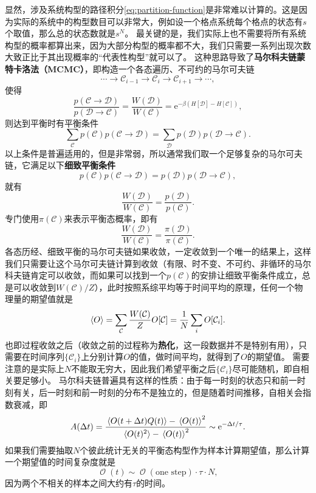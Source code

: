 \documentclass[hyperref, UTF8, a4paper]{ctexart}
\newcommand*{\ee}{\mathrm{e}}
\DeclareMathOperator{\bigO}{\mathcal{O}}
\newcommand*{\concept}[1]{{\textbf{#1}}}
\begin{document}
显然，涉及系统构型的路径积分\eqref{eq:partition-function}是非常难以计算的。这是因为实际的系统中的构型数目可以非常大，例如设一个格点系统每个格点的状态有$s$个取值，那么总的状态数就是$s^N$。
最关键的是，我们实际上也不需要将所有系统构型的概率都算出来，因为大部分构型的概率都不大，我们只需要一系列出现次数大致正比于其出现概率的“代表性构型”就可以了。
这种思路导致了\concept{马尔科夫链蒙特卡洛法（MCMC）}，即构造一个各态遍历、不可约的马尔可夫链
\[
    \cdots \longrightarrow \mathcal{C}_{i-1} \longrightarrow \mathcal{C}_i \longrightarrow \mathcal{C}_{i+1} \longrightarrow \cdots,
\]
使得
\begin{equation}
    \frac{p(\mathcal{C} \rightarrow \mathcal{D})}{p(\mathcal{D} \rightarrow \mathcal{C})} = \frac{W(\mathcal{D})}{W(\mathcal{C})} = \ee^{-\beta(H[\mathcal{D}]-H[\mathcal{C}])},
    \label{eq:markov-mcmc}
\end{equation}
则达到平衡时有平衡条件
\[
    \sum_{\mathcal{C}} p(\mathcal{C}) p(\mathcal{C} \rightarrow \mathcal{D}) = \sum_{\mathcal{D}} p(\mathcal{D}) p(\mathcal{D} \rightarrow \mathcal{C}).
\]
以上条件是普遍适用的，但是非常弱，所以通常我们取一个足够复杂的马尔可夫链，它满足以下\concept{细致平衡条件}
\[
    p(\mathcal{C}) p(\mathcal{C} \rightarrow \mathcal{D}) = p(\mathcal{D}) p(\mathcal{D} \rightarrow \mathcal{C}),
\]
就有
\[
    \frac{W(\mathcal{D})}{W(\mathcal{C})} = \frac{p(\mathcal{D})}{p(\mathcal{C})}.
\]
专门使用$\pi(\mathcal{C})$来表示平衡态概率，即有
\begin{equation}
    \frac{W(\mathcal{D})}{W(\mathcal{C})} = \frac{\pi(\mathcal{D})}{\pi(\mathcal{C})}.
\end{equation}
各态历经、细致平衡的马尔可夫链如果收敛，一定收敛到一个唯一的结果上，这样我们只需要让这个马尔可夫链计算到收敛（有限、时不变、不可约、非循环的马尔科夫链肯定可以收敛，而如果可以找到一个$p(\mathcal{C})$的安排让细致平衡条件成立，总是可以收敛到$W(\mathcal{C})/Z$），此时按照系综平均等于时间平均的原理，任何一个物理量的期望值就是
\begin{equation}
    \expval{O} = \sum_{\mathcal{C}} \frac{W(\mathcal{C})}{Z} O[\mathcal{C}] = \frac{1}{N} \sum_i O[\mathcal{C}_i].
    \label{eq:classical-expectation}
\end{equation}
也即过程收敛之后（收敛之前的过程称为\concept{热化}，这一段数据并不是特别有用），只需要在时间序列$\{\mathcal{C}_i\}$上分别计算$O$的值，做时间平均，就得到了$O$的期望值。
需要注意的是实际上$N$不能取无穷大，因此我们希望平衡之后$\{\mathcal{C}_i\}$尽可能随机，即自相关要足够小。
马尔科夫链普遍具有这样的性质：由于每一时刻的状态只和前一时刻有关，后一时刻和前一时刻的分布不是独立的，但是随着时间推移，自相关会指数衰减，即
\begin{equation}
    A(\Delta t) = \frac{\expval*{O(t+\Delta t) Q(t)} - \expval*{O(t)}^2}{\expval*{O(t)^2} - \expval*{O(t)}^2} \sim \ee^{- \Delta t / \tau}.
\end{equation}
如果我们需要抽取$N$个彼此统计无关的平衡态构型作为样本计算期望值，那么计算一个期望值的时间复杂度就是
\begin{equation}
    \bigO(t) \sim \bigO(\text{one step}) \cdot \tau \cdot N,
\end{equation}
因为两个不相关的样本之间大约有$\tau$的时间。
\end{document}
